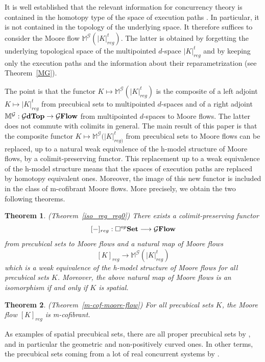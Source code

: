 \documentclass[a4paper,12pt]{amsart}
\newtheorem*{thmN}{Theorem}
\theoremstyle{definition}
\newcommand{\ptop}[1]{{\brm{{#1}dTop}}}
\newcommand{\moore}{{\mathbb{M}}}
\newcommand{\brm}[1]{{\rm{\mathbf{#1}}}}
\newcommand{\dtopG}{{\mathcal{G}\brm{Flow}}}
\newcommand{\set}{{\brm{Set}}}
\begin{document}
It is well established that the relevant information for concurrency theory is contained in the homotopy type of the space of execution paths \cite{DAT_book}. In particular, it is not contained in the topology of the underlying space. It therefore suffices to consider the Moore flow $\moore^{\mathcal{G}}(|K|^t_{reg})$. The latter is obtained by forgetting the underlying topological space of the multipointed $d$-space $|K|^t_{reg}$ and by keeping only the execution paths and the information about their reparametrization (see Theorem~\ref{MG}). 

The point is that the functor $K\mapsto\moore^{\mathcal{G}}(|K|^t_{reg})$ is the composite of a left adjoint $K\mapsto |K|^t_{reg}$ from precubical sets to multipointed $d$-spaces and of a right adjoint $\moore^{\mathcal{G}}:\ptop{\mathcal{G}} \to \dtopG$ from multipointed $d$-spaces to Moore flows. The latter does not commute with colimits in general. The main result of this paper is that the composite functor $K\mapsto \moore^{\mathcal{G}}(|K|^t_{reg)}$ from precubical sets to Moore flows can be replaced, up to a natural weak equivalence of the h-model structure of Moore flows, by a colimit-preserving functor. This replacement up to a weak equivalence of the h-model structure means that the spaces of execution paths are replaced by homotopy equivalent ones. Moreover, the image of this new functor is included in the class of m-cofibrant Moore flows. More precisely, we obtain the two following theorems.

\begin{thmN}  (Theorem~\ref{iso_reg_reg0})
	There exists a colimit-preserving functor \[[-]_{reg}:\square^{op}\set \longrightarrow \dtopG\] from precubical sets to Moore flows and a natural map of Moore flows \[[K]_{reg} \longrightarrow \moore^{\mathcal{G}}(|K|^t_{reg})\] which is a weak equivalence of the h-model structure of Moore flows for all precubical sets $K$. Moreover, the above natural map of Moore flows is an isomorphism if and only if $K$ is spatial. 
\end{thmN}

\begin{thmN} (Theorem~\ref{m-cof-moore-flow})
	For all precubical sets $K$, the Moore flow $[K]_{reg}$ is m-cofibrant.
\end{thmN}

As examples of spatial precubical sets, there are all proper precubical sets by \cite[Proposition~7.5]{NaturalRealization}, and in particular the geometric and non-positively curved ones. In other terms, the precubical sets coming from a lot of real concurrent systems by \cite[Proposition~1.29]{zbMATH07226006}. 
\end{document}
